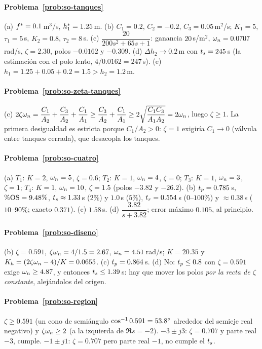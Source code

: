 \paragraph{Problema~\ref{prob:so-tanques}}
(a) $f^{*}=0.1$\,m$^3$/s, $h_1^{*}=1.25$\,m. (b) $C_1=0.2$, $C_2=-0.2$, $C_3=0.05$\,m$^2$/s; $K_1=5$, $\tau_1=5$\,s, $K_2=0.8$, $\tau_2=8$\,s. (c) $\dfrac{20}{200s^2+65s+1}$: ganancia $20$\,s/m$^2$, $\omega_n=0.0707$\,rad/s, $\zeta=2.30$, polos $-0.0162$ y $-0.309$. (d) $\Delta h_2\to0.2$\,m con $t_s=245$\,s (la estimación con el polo lento, $4/0.0162=247$\,s). (e) $h_1=1.25+0.05+0.2=1.5>h_2=1.2$\,m.

\paragraph{Problema~\ref{prob:so-zeta-tanques}}
(c) $2\zeta\omega_n=\dfrac{C_1}{A_2}+\dfrac{C_3}{A_2}+\dfrac{C_1}{A_1}\geq\dfrac{C_3}{A_2}+\dfrac{C_1}{A_1}\geq2\sqrt{\dfrac{C_1C_3}{A_1A_2}}=2\omega_n$, luego $\zeta\geq1$. La primera desigualdad es estricta porque $C_1/A_2>0$: $\zeta=1$ exigiría $C_1\to0$ (válvula entre tanques cerrada), que desacopla los tanques.

\paragraph{Problema~\ref{prob:so-cuatro}}
(a) $T_1$: $K=2$, $\omega_n=5$, $\zeta=0.6$; $T_2$: $K=1$, $\omega_n=4$, $\zeta=0$; $T_3$: $K=1$, $\omega_n=3$, $\zeta=1$; $T_4$: $K=1$, $\omega_n=10$, $\zeta=1.5$ (polos $-3.82$ y $-26.2$). (b) $t_p=0.785$\,s, $\%\mathrm{OS}=9.48\%$, $t_s\approx1.33$\,s ($2\%$) y $1.0$\,s ($5\%$), $t_r=0.554$\,s ($0$--$100\%$) y $\approx0.38$\,s ($10$--$90\%$; exacto $0.371$). (c) $1.58$\,s. (d) $\dfrac{3.82}{s+3.82}$; error máximo $0.105$, al principio.

\paragraph{Problema~\ref{prob:so-diseno}}
(b) $\zeta=0.591$, $\zeta\omega_n=4/1.5=2.67$, $\omega_n=4.51$\,rad/s; $K=20.35$ y $K_h=(2\zeta\omega_n-4)/K=0.0655$. (c) $t_p=0.864$\,s. (d) No: $t_p\leq0.8$ con $\zeta=0.591$ exige $\omega_n\geq4.87$, y entonces $t_s\leq1.39$\,s: hay que mover los polos \emph{por la recta de $\zeta$ constante}, alejándolos del origen.

\paragraph{Problema~\ref{prob:so-region}}
$\zeta\geq0.591$ (un cono de semiángulo $\cos^{-1}0.591=53.8^{\circ}$ alrededor del semieje real negativo) y $\zeta\omega_n\geq2$ (a la izquierda de $\Re s=-2$). $-3\pm j3$: $\zeta=0.707$ y parte real $-3$, cumple. $-1\pm j1$: $\zeta=0.707$ pero parte real $-1$, no cumple el $t_s$.

